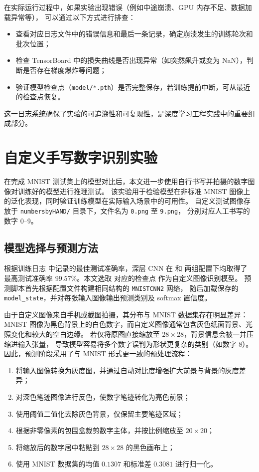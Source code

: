 \documentclass[UTF8,a4paper,12pt]{ctexart}
\begin{document}
在实际运行过程中，如果实验出现错误（例如中途崩溃、GPU 内存不足、数据加载异常等），
可以通过以下方式进行排查：
\begin{itemize}
    \item 查看对应日志文件中的错误信息和最后一条记录，确定崩溃发生的训练轮次和批次位置；
    \item 检查 TensorBoard 中的损失曲线是否出现异常（如突然飙升或变为 NaN），判断是否存在梯度爆炸等问题；
    \item 验证模型检查点（\texttt{model/*.pth}）是否完整保存，若训练提前中断，可从最近的检查点恢复。
\end{itemize}

这一日志系统确保了实验的可追溯性和可复现性，是深度学习工程实践中的重要组成部分。

\section{自定义手写数字识别实验}

在完成 MNIST 测试集上的模型对比后，本文进一步使用自行书写并拍摄的数字图像对训练好的模型进行推理测试。
该实验用于检验模型在非标准 MNIST 图像上的泛化表现，同时验证训练模型在实际输入场景中的可用性。
自定义测试图像存放于 \texttt{numbersbyHAND/} 目录下，文件名为 \texttt{0.png} 至 \texttt{9.png}，
分别对应人工书写的数字 0--9。

\subsection{模型选择与预测方法}

根据训练日志  中记录的最佳测试准确率，深层 CNN 在
 和  两组配置下均取得了
最高测试准确率 $99.57\%$。本文选取  对应的检查点
 作为自定义图像识别模型。
预测脚本首先根据配置文件构建相同结构的 \texttt{MNISTCNN2} 网络，
随后加载保存的 \texttt{model\_state}，并对每张输入图像输出预测类别及 softmax 置信度。

由于自定义图像来自手机或截图拍摄，其分布与 MNIST 数据集存在明显差异：
MNIST 图像为黑色背景上的白色数字，而自定义图像通常包含灰色纸面背景、光照变化和较大的空白边缘。
若仅将原图直接缩放至 $28\times28$，背景信息会被一并压缩进输入张量，
导致模型容易将多个数字误判为形状更复杂的类别（如数字 8）。
因此，预测阶段采用了与 MNIST 形式更一致的预处理流程：

\begin{enumerate}
    \item 将输入图像转换为灰度图，并通过自动对比度增强扩大前景与背景的灰度差异；
    \item 对深色笔迹图像进行反色，使数字笔迹转化为亮色前景；
    \item 使用阈值二值化去除灰色背景，仅保留主要笔迹区域；
    \item 根据非零像素的包围盒裁剪数字主体，并按比例缩放至 $20\times20$；
    \item 将缩放后的数字居中粘贴到 $28\times28$ 的黑色画布上；
    \item 使用 MNIST 数据集的均值 $0.1307$ 和标准差 $0.3081$ 进行归一化。
\end{enumerate}
\end{document}
